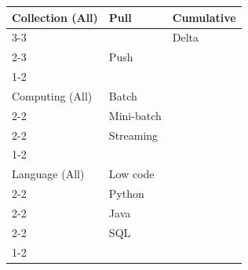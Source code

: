 \begin{table}[!ht]
\begin{tabular}{lll}
Collection (All)        & Pull                  & Cumulative\\\cline{3-3}
                        &                       & Delta\\\cline{2-3}
                        & Push                  & \\\cline{1-2}
&&\\
Computing (All)         & Batch                 & \\\cline{2-2}
                        & Mini-batch            & \\\cline{2-2}
                        & Streaming             & \\\cline{1-2}
&&\\
Language (All)          & Low code              & \\\cline{2-2}
                        & Python                & \\\cline{2-2}
                        & Java                  & \\\cline{2-2}
                        & SQL                   & \\\cline{1-2}
\end{tabular}%
\end{table}%

